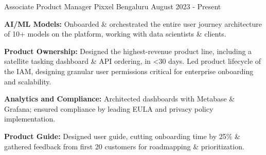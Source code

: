 

\begin{cventries}

  \cventry
    {Associate Product Manager} %
    {Pixxel } %
    {Bengaluru} %
    {August 2023 - Present} %
    {
      \begin{cvitems} %
        \item {\textbf{AI/ML Models: }Onboarded \& orchestrated the entire user journey architecture of 10+ models on the platform, working with data scientists \& clients.}
        \item {\textbf{Product Ownership: }Designed the highest-revenue product line, including a satellite tasking dashboard \& API ordering, in <30 days. Led product lifecycle of the IAM, designing granular user permissions critical for enterprise onboarding and scalability.}
        \item {\textbf{Analytics and Compliance: }Architected dashboards with Metabase \& Grafana; ensured compliance by leading EULA and privacy policy implementation.}
        \item {\textbf{Product Guide: }Designed user guide, cutting onboarding time by 25\% \& gathered feedback from first 20 customers for roadmapping \& prioritization.}
      \end{cvitems}
    }


\end{cventries}
